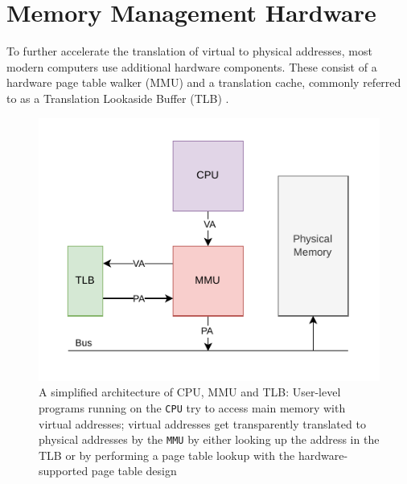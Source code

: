 


\section{Memory Management Hardware}
To further accelerate the translation of virtual to physical addresses, most modern computers use additional
\cite{denning1970virtual} hardware components. These consist of a hardware page table walker (MMU) and a translation cache,
commonly referred to as a Translation Lookaside Buffer (TLB) \cite{jacobVirtualMemoryContemporary1998}.

\begin{figure}[t]
    \centering
    \includegraphics[scale=1.2]{figures/simple_mmu_arch.pdf}
    \caption[A simplified architecture of CPU, MMU and TLB]{A simplified architecture of CPU, MMU and TLB:
        User-level programs running on the \texttt{CPU} try to access main memory with virtual
        addresses; virtual addresses get transparently translated to physical addresses by the
        \texttt{MMU} by either looking up the address in the TLB or by performing a page table
        lookup with the hardware-supported page table design}
    \label{fig:fund:simplearch}
\end{figure}

